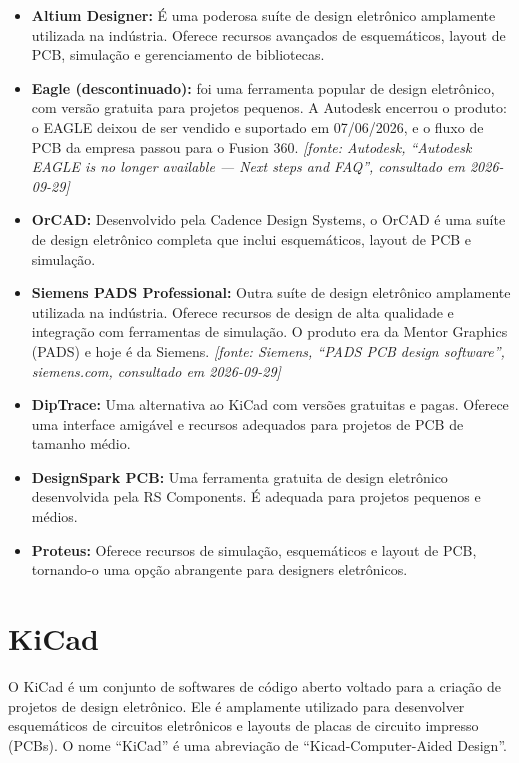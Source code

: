 \begin{itemize}
\item
  \textbf{Altium Designer:} É uma poderosa suíte de design eletrônico amplamente utilizada na indústria. Oferece recursos avançados de esquemáticos, layout de PCB, simulação e gerenciamento de bibliotecas.
\item
  \textbf{Eagle (descontinuado):} foi uma ferramenta popular de design eletrônico, com versão gratuita para projetos pequenos. A Autodesk encerrou o produto: o EAGLE deixou de ser vendido e suportado em 07/06/2026, e o fluxo de PCB da empresa passou para o Fusion 360. \emph{{[}fonte: Autodesk, ``Autodesk EAGLE is no longer available --- Next steps and FAQ'', consultado em 2026-09-29{]}}
\item
  \textbf{OrCAD:} Desenvolvido pela Cadence Design Systems, o OrCAD é uma suíte de design eletrônico completa que inclui esquemáticos, layout de PCB e simulação.
\item
  \textbf{Siemens PADS Professional:} Outra suíte de design eletrônico amplamente utilizada na indústria. Oferece recursos de design de alta qualidade e integração com ferramentas de simulação. O produto era da Mentor Graphics (PADS) e hoje é da Siemens. \emph{{[}fonte: Siemens, ``PADS PCB design software'', siemens.com, consultado em 2026-09-29{]}}
\item
  \textbf{DipTrace:} Uma alternativa ao KiCad com versões gratuitas e pagas. Oferece uma interface amigável e recursos adequados para projetos de PCB de tamanho médio.
\item
  \textbf{DesignSpark PCB:} Uma ferramenta gratuita de design eletrônico desenvolvida pela RS Components. É adequada para projetos pequenos e médios.
\item
  \textbf{Proteus:} Oferece recursos de simulação, esquemáticos e layout de PCB, tornando-o uma opção abrangente para designers eletrônicos.
\end{itemize}

\hypertarget{kicad}{%
\chapter{KiCad}\label{kicad}}

O KiCad é um conjunto de softwares de código aberto voltado para a criação de projetos de design eletrônico. Ele é amplamente utilizado para desenvolver esquemáticos de circuitos eletrônicos e layouts de placas de circuito impresso (PCBs). O nome ``KiCad'' é uma abreviação de ``Kicad-Computer-Aided Design''.


